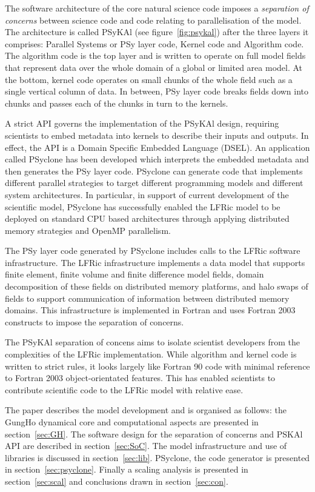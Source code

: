 \documentclass[review,times]{elsarticle}
\begin{document}
The software architecture of the core natural science code imposes a
{\em separation of concerns} between science code and code relating to
parallelisation of the model. The architecture is called PSyKAl (see
figure~\ref{fig:psykal}) after the three layers it comprises: Parallel
Systems or PSy layer code, Kernel code and Algorithm code. The
algorithm code is the top layer and is written to operate on full
model fields that represent data over the whole domain of a global or
limited area model. At the bottom, kernel code operates on small
chunks of the whole field such as a single vertical column of data. In
between, PSy layer code breaks fields down into chunks and passes each
of the chunks in turn to the kernels.

A strict API governs the implementation of the PSyKAl design,
requiring scientists to embed metadata into kernels to describe their
inputs and outputs. In effect, the API is a Domain Specific Embedded
Language (DSEL). An application called PSyclone has been developed
which interprets the embedded metadata and then generates the PSy
layer code. PSyclone can generate code that implements different
parallel strategies to target different programming models and
different system architectures. In particular, in support of current
development of the scientific model, PSyclone has successfully enabled
the LFRic model to be deployed on standard CPU based architectures through
applying distributed memory strategies and OpenMP parallelism.

The PSy layer code generated by PSyclone includes calls to the LFRic
software infrastructure. The LFRic infrastructure implements a data
model that supports finite element, finite volume and finite
difference model fields, domain decomposition of these fields on
distributed memory platforms, and halo swaps of fields to support
communication of information between distributed memory domains. This
infrastructure is implemented in Fortran and uses Fortran 2003
constructs to impose the separation of concerns.

The PSyKAl separation of concens aims to isolate scientist developers
from the complexities of the LFRic implementation. While algorithm and
kernel code is written to strict rules, it looks largely like Fortran
90 code with minimal reference to Fortran 2003 object-orientated
features. This has enabled scientists to contribute scientific code to
the LFRic model with relative ease.

The paper describes the model development and is organised as follows:
the GungHo dynamical core and computational aspects are presented in
section~\ref{sec:GH}. The software design for the separation of
concerns and PSKAl API are described in
section~\ref{sec:SoC}. The model infrastructure and use of libraries
is discussed in section~\ref{sec:lib}. PSyclone, the code generator is
presented in section~\ref{sec:psyclone}. Finally a scaling analysis is
presented in section~\ref{sec:scal} and conclusions drawn in
section~\ref{sec:con}.
\end{document}
